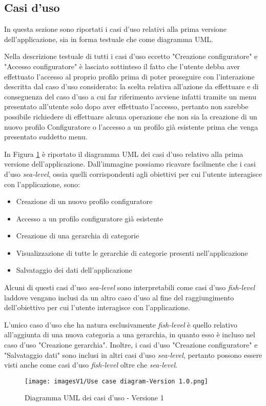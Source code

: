 \subsection{Casi d'uso}
In questa sezione sono riportati i casi d'uso relativi alla prima versione dell'applicazione, sia in forma testuale che come diagramma UML.\bigskip 

Nella descrizione testuale di tutti i casi d'uso eccetto "Creazione configuratore" e "Accesso configuratore" è lasciato sottinteso il fatto che l'utente debba aver effettuato l'accesso al proprio profilo prima di poter proseguire con l'interazione descritta dal caso d'uso considerato: la scelta relativa all'azione da effettuare e di conseguenza del caso d'uso a cui far riferimento avviene infatti tramite un menu presentato all'utente solo dopo aver effettuato l'accesso, pertanto non sarebbe possibile richiedere di effettuare alcuna operazione che non sia la creazione di un nuovo profilo Configuratore o l'accesso a un profilo già esistente prima che venga presentato suddetto menu.\bigskip



In Figura \ref{fig:Use Case 1} è riportato il diagramma UML dei casi d'uso relativo alla prima versione dell'applicazione. Dall'immagine possiamo ricavare facilmente che i casi d'uso \textit{sea-level}, ossia quelli corrispondenti agli obiettivi per cui l'utente interagisce con l'applicazione, sono:
\begin{itemize}
    \item Creazione di un nuovo profilo configuratore 
    \item Accesso a un profilo configuratore già esistente
    \item Creazione di una gerarchia di categorie
    \item Visualizzazione di tutte le gerarchie di categorie presenti nell'applicazione
    \item Salvataggio dei dati dell'applicazione
\end{itemize}
Alcuni di questi casi d'uso \textit{sea-level} sono interpretabili come casi d'uso \textit{fish-level} laddove vengano inclusi da un altro caso d'uso al fine del raggiungimento dell'obiettivo per cui l'utente interagisce con l'applicazione.

L'unico caso d'uso che ha natura esclusivamente \textit{fish-level} è quello relativo all'aggiunta di una nuova categoria a una gerarchia, in quanto esso è incluso nel caso d'uso "Creazione gerarchia". Inoltre, i casi d'uso "Creazione configuratore" e "Salvataggio dati" sono inclusi in altri casi d'uso \textit{sea-level}, pertanto possono essere visti anche come casi d'uso \textit{fish-level} oltre che \textit{sea-level}.

\begin{figure}[hb]
\centering
\texttt{[image: imagesV1/Use case diagram-Version 1.0.png]}
\caption{\label{fig:Use Case 1}Diagramma UML dei casi d'uso - Versione 1}
\end{figure}\bigskip